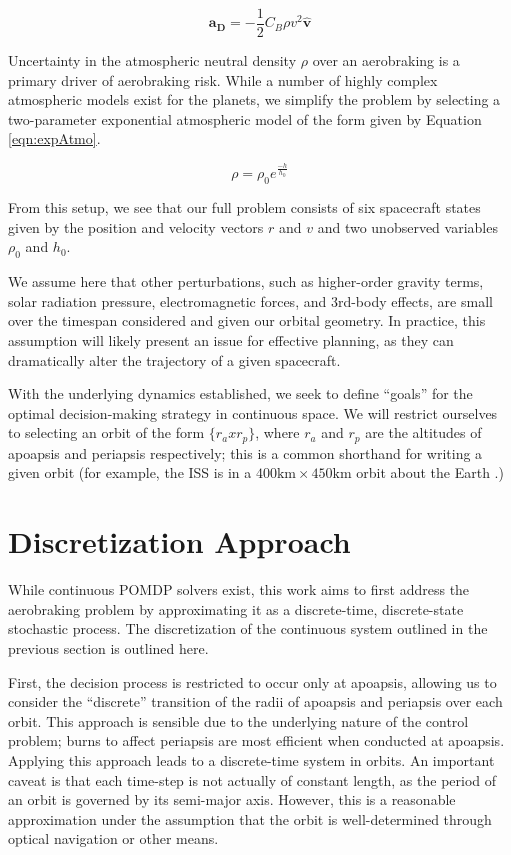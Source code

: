 \documentclass[paper,11pt]{AAS}		%
\begin{document}
\begin{equation}
\mathbf{a_D} = -\frac{1}{2} C_{B} \rho v^2 \hat{\mathbf{v}}
\label{eqn:dragEqn}
\end{equation}

Uncertainty in the atmospheric neutral density $\rho$ over an aerobraking is a 
primary driver of aerobraking risk. While a number of highly complex atmospheric models exist for the planets, we simplify the 
problem by selecting a two-parameter exponential atmospheric model of the form given by Equation \ref{eqn:expAtmo}. 

\begin{equation}
\rho = \rho_0 e^{\frac{-h}{h_0}}
\label{eqn:expAtmo}
\end{equation}

From this setup, we see that our full problem consists of six spacecraft states given by the position and velocity vectors $r$ 
and $v$ and two unobserved variables $\rho_0$ and $h_0$. 

We assume here that other perturbations, such as higher-order gravity terms, solar radiation pressure, electromagnetic forces, 
and 3rd-body effects, are small over the timespan considered and given our orbital geometry. In practice, this assumption will 
likely present an issue for effective planning, as they can dramatically alter the trajectory of a given spacecraft.

With the underlying dynamics established, we seek to define ``goals'' for the optimal decision-making strategy in continuous 
space. We will restrict ourselves to selecting an orbit of the form $\{r_a x r_p\}$, where $r_a$ and $r_p$ are the altitudes 
of apoapsis and periapsis respectively; this is a common shorthand for writing a given orbit (for example, the ISS is in a 
$400\text{km} \times 450\text{km}$ orbit about the Earth \cite{Vallado2013}.)

\section{Discretization Approach}
While continuous POMDP solvers exist, this work aims to first address the aerobraking problem by approximating it as a 
discrete-time, discrete-state stochastic process. The discretization of the continuous system outlined in the previous section 
is outlined here.

 First, the decision process is restricted to occur only at apoapsis, allowing us to consider the ``discrete'' transition of 
 the radii 
of apoapsis and periapsis over each orbit. This approach is sensible due to the underlying 
nature of the control problem; burns to affect periapsis are most efficient when conducted at apoapsis. Applying this approach 
leads to a discrete-time system in orbits. An important caveat is that each time-step is not actually of constant length, as 
the period of an orbit is governed by its semi-major axis. However, this is a reasonable approximation under the assumption 
that the orbit is well-determined 
through optical navigation or other means.
\end{document}
